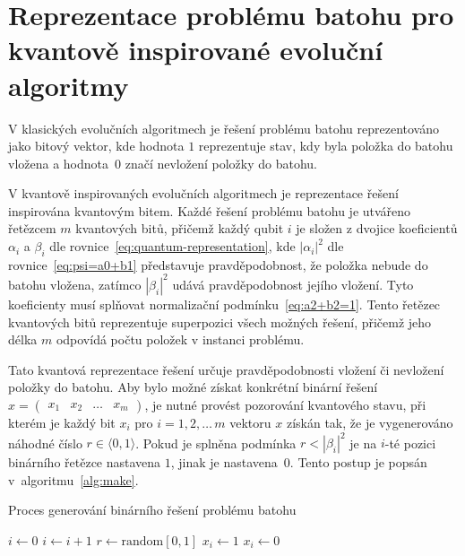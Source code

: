 \section{Reprezentace problému batohu pro kvantově inspirované evoluční algoritmy}
V klasických evolučních algoritmech je řešení problému batohu reprezentováno jako bitový vektor, kde hodnota $1$ reprezentuje stav, kdy byla položka do batohu vložena a hodnota~$0$ značí nevložení položky do batohu.

V kvantově inspirovaných evolučních algoritmech je reprezentace řešení inspirována kvantovým bitem. 
Každé řešení problému batohu je utvářeno řetězcem $m$ kvantových bitů, přičemž každý qubit $i$ je složen z dvojice koeficientů $\alpha_i$ a $\beta_i$ dle rovnice~\ref{eq:quantum-representation}, kde $\left| \alpha_i \right|^2$ dle rovnice~\ref{eq:psi=a0+b1} představuje pravděpodobnost, že položka nebude do batohu vložena, zatímco $\left| \beta_i \right|^2$ udává pravděpodobnost jejího vložení. 
Tyto koeficienty musí splňovat normalizační podmínku~\ref{eq:a2+b2=1}.
Tento řetězec kvantových bitů reprezentuje superpozici všech možných řešení, přičemž jeho délka $m$ odpovídá počtu položek v instanci problému.

Tato kvantová reprezentace řešení určuje pravděpodobnosti vložení či nevložení položky do batohu. 
Aby bylo možné získat konkrétní binární řešení $x = \begin{pmatrix} x_1 & x_2 & \dots & x_m \end{pmatrix}$, je nutné provést pozorování kvantového stavu, při kterém je každý bit $x_i$ pro $i = 1,2,\dots\,m$ vektoru $x$ získán tak, že je vygenerováno náhodné číslo $r \in \langle 0, 1 \rangle$. 
Pokud je splněna podmínka $r < \left| \beta_i \right|^2$ je na $i$-té pozici binárního řetězce nastavena $1$, jinak je nastavena~$0$. 
Tento postup je popsán v~algoritmu~\ref{alg:make}.
\begin{algorithm}[ht!]
    \caption{Proces generování binárního řešení problému batohu}
    \label{alg:make}
    \begin{algorithmic}[1]
        \State $i \gets 0$
            \State $i \gets i + 1$
            \State $r \gets  \text{random}[0,1]$
                \State $x_i \gets 1$
            \Else
                \State $x_i \gets 0$
            \EndIf
        \EndWhile
    \end{algorithmic}
\end{algorithm}

